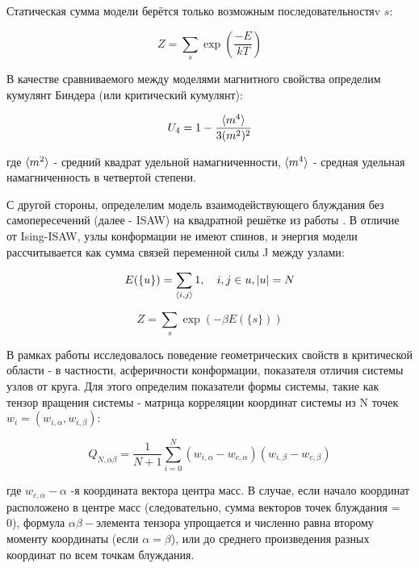 Статическая сумма модели берётся только возможным последовательностяv ${s}$:

\begin{equation}
Z = \sum_s \exp{(\frac{-E}{kT})}
\end{equation}

В качестве сравниваемого между моделями магнитного свойства определим кумулянт Биндера (или критический кумулянт):

\begin{equation}
\label{eq:Cumulant}
U_{4} = 1 - \frac{\langle m^{4} \rangle}{3 (m^{2})^{2}}
\end{equation}

где $\langle m^{2} \rangle$  - средний квадрат удельной намагниченности, $\langle m^{4} \rangle$ - средная удельная намагниченность в четвертой степени. 

С другой стороны, определелим модель взаимодействующего блуждания без самопересечений (далее - ISAW) на квадратной решётке из работы \cite{caracciolo2011geometrical}.
В отличие от Ising-ISAW, узлы конформации не имеют спинов, и энергия модели рассчитывается как сумма связей переменной силы J между узлами:

\begin{equation}
E(\{u\}) = \sum_{\la i, j \ra} 1,\ \ \ i,j \in u, |u|=N
\end{equation}

\begin{equation}
Z = \sum_s \exp{(- \beta E(\{s\}))}
\end{equation}

В рамках работы \cite{caracciolo2011geometrical} исследовалось поведение геометрических свойств в критической области - в частности, асферичности конформации, показателя отличия системы узлов от круга.
Для этого определим показатели формы системы, такие как тензор вращения системы - матрица корреляции координат системы из N точек $w_i = (w_{i,\alpha}, w_{i,\beta})$:

\begin{equation}\label{eq:Ten_G1}
    Q_{N,\alpha\beta} = \frac{1}{N+1} \sum^{N}_{i=0}(w_{i,\alpha} - w_{c, \alpha})(w_{i,\beta} - w_{c, \beta})
\end{equation}

где $w_{c,\alpha} - \alpha$ -я координата вектора центра масс. В случае, если начало координат расположено в центре масс (следовательно, сумма векторов точек блуждания = 0), формула $\alpha\beta-$элемента тензора упрощается и численно равна второму моменту координаты (если $\alpha = \beta$), или до среднего произведения разных координат по всем точкам блуждания.

